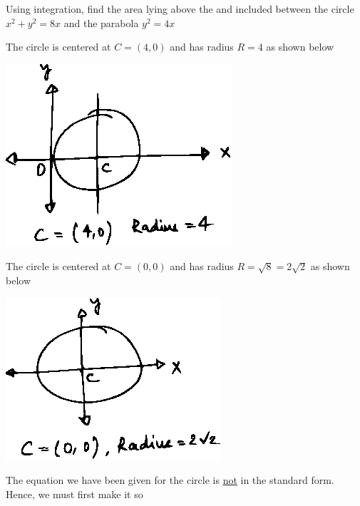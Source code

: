 \documentclass[14pt,fleqn]{extarticle}
\begin{document}
 

\begin{question}
	\statement 
    
     Using integration, find the area lying above the \xaxis and included between the circle $x^2 + y^2 = 8x$ and the parabola $y^2 = 4x$ 
     
     \begin{step}
  \begin{options} 
     \correct 
       
     The circle is centered at $C = \left(4,0 \right)$ and has radius $R = 4$ as shown below 

     \begin{center}
\includegraphics[scale=1.2]{1381-A.eps}
\end{center}
     \incorrect
     
          The circle is centered at $C = \left(0,0 \right)$ and has radius $R = \sqrt{8} = 2\sqrt{2}$ as shown below 
        
        \begin{center}
\includegraphics[scale=1.2]{1381-B.eps}
\end{center}
    \end{options} 
     \reason 
     
     The equation we have been given for the circle is \underline{not} in the 
     standard form. Hence, we must first make it so
     

\end{step}
\end{question}
\end{document}
